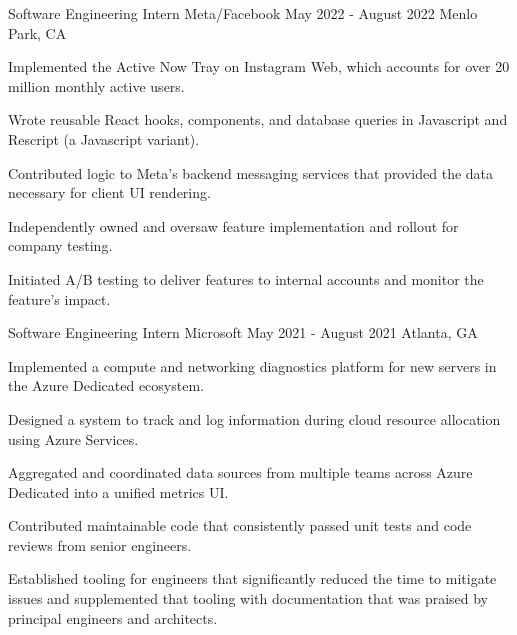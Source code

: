 

\begin{cventries}

\cventry
{Software Engineering Intern}
{Meta/Facebook}
{May 2022 - August 2022}
{Menlo Park, CA}
{
\begin{cvitems}
    \item Implemented the Active Now Tray on Instagram Web, which accounts for over 20 million monthly active users. 
    \item Wrote reusable React hooks, components, and database queries in Javascript and Rescript (a Javascript variant).
    \item Contributed logic to Meta's backend messaging services that provided the data necessary for client UI rendering.
    \item Independently owned and oversaw feature implementation and rollout for company testing.
    \item Initiated A/B testing to deliver features to internal accounts and monitor the feature's impact.
\end{cvitems}
}

\cventry
{Software Engineering Intern}
{Microsoft}
{May 2021 - August 2021}
{Atlanta, GA}
{
\begin{cvitems}
    \item Implemented a compute and networking diagnostics platform for new servers in the Azure Dedicated ecosystem.
    \item Designed a system to track and log information during cloud resource allocation using Azure Services.
    \item Aggregated and coordinated data sources from multiple teams across Azure Dedicated into a unified metrics UI.
    \item Contributed maintainable code that consistently passed unit tests and code reviews from senior engineers.
    \item Established tooling for engineers that significantly reduced the time to mitigate issues
    and supplemented that tooling with documentation that was praised by principal engineers and architects.
\end{cvitems}
}


\end{cventries}

